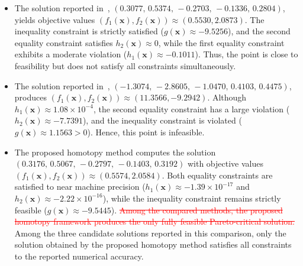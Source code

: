 \documentclass[11pt,pdflatex,sn-mathphys-ay]{sn-jnl}%
\theoremstyle{definition}
\theoremstyle{thmstyleone}%
\theoremstyle{thmstyletwo}%
\theoremstyle{thmstylethree}%
\newcommand{\del}[1]{\textcolor{red}{\sout{#1}}}
\newcommand{\add}[1]{\textcolor{revisionblue}{#1}}
\begin{document}
	
	\begin{itemize}
		\item 
		The solution reported in~\cite{shang2011},
		$(0.3077,\,0.5374,\,-0.2703,\,-0.1336,\,0.2804)$,
		yields objective values
		$(f_{1}(\bm{x}), f_{2}(\bm{x})) \approx (0.5530, 2.0873)$.
		The inequality constraint is strictly satisfied
		($g(\bm{x}) \approx -9.5256$),
		and the second equality constraint satisfies
		$h_{2}(\bm{x}) \approx 0$,
		while the first equality constraint exhibits a moderate violation
		($h_{1}(\bm{x}) \approx -0.1011$).
		Thus, the point is close to feasibility but does not satisfy all constraints simultaneously.
		
		\item 
		The solution reported in~\cite{zhao2012quasinormal},
		$(-1.3074,\,-2.8605,\,-1.0470,\,0.4103,\,0.4475)$,
		produces
		$(f_{1}(\bm{x}), f_{2}(\bm{x})) \approx (11.3566, -9.2942)$.
		Although $h_{1}(\bm{x}) \approx 1.08\times 10^{-4}$,
		the second equality constraint has a large violation
		($h_{2}(\bm{x}) \approx -7.7391$),
		and the inequality constraint is violated
		($g(\bm{x}) \approx 1.1563 > 0$).
		Hence, this point is infeasible.
		
		\item 
		The proposed homotopy method computes the solution
		$(0.3176,\,0.5067,\,-0.2797,\,-0.1403,\,0.3192)$
		with objective values
		$(f_{1}(\bm{x}), f_{2}(\bm{x})) \approx (0.5574, 2.0584)$.
		Both equality constraints are satisfied to near machine precision
		($h_{1}(\bm{x}) \approx -1.39\times10^{-17}$ and $h_{2}(\bm{x}) \approx -2.22\times10^{-16}$),
		while the inequality constraint remains strictly feasible
		($g(\bm{x}) \approx -9.5445$).
		\del{Among the compared methods, the proposed homotopy
			framework produces the only fully feasible
			Pareto-critical solution.}
		\add{Among the three candidate solutions reported
			in this comparison, only the solution obtained
			by the proposed homotopy method satisfies all
			constraints to the reported numerical accuracy.}
	\end{itemize}
\end{document}
